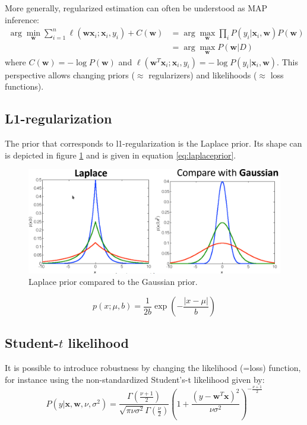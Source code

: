 \documentclass[a4paper,10pt,twoside]{article}
\begin{document}
More generally, regularized estimation can often be understood as MAP inference:
\begin{align*}
    \arg\min_{\mathbf{w}}\sum_{i=1}^{n}\ell(\mathbf{w}\mathbf{x}_i;\mathbf{x}_i, y_i)+C(\mathbf{w})&=\arg\max_{\mathbf{w}}\prod_i P(y_i|\mathbf{x}_i,\mathbf{w})P(\mathbf{w})\\
    &=\arg\max_{\mathbf{w}}P(\mathbf{w}|D)
\end{align*}
where $C(\mathbf{w})=-\log P(\mathbf{w})$ and $\ell(\mathbf{w}^T\mathbf{x}_i;\mathbf{x}_i,y_i)=-\log P(y_i|\mathbf{x}_i,\mathbf{w})$. This perspective allows changing priors ($\approx$ regularizers) and likelihoods ($\approx$ loss functions).

\subsection{L1-regularization}
The prior that corresponds to l1-regularization is the Laplace prior. Its shape can is depicted in figure \ref{laplaceprior} and is given in equation \ref{eq:laplaceprior}.

\begin{figure}[]
    \centering
    \includegraphics[width=.5\textwidth]{figures/laplaceprior.png}
    \caption{Laplace prior compared to the Gaussian prior.}
    \label{laplaceprior}
\end{figure}

\begin{equation}\label{eq:laplaceprior}
    p(x;\mu, b) = \frac{1}{2b}\exp(-\frac{|x-\mu|}{b})
\end{equation}

\subsection{Student-$t$ likelihood}
It is possible to introduce robustness by changing the likelihood (=loss) function, for instance using the non-standardized Student's-t likelihood given by:
\begin{equation*}
    P(y|\mathbf{x}, \mathbf{w},\nu,\sigma^2)=\frac{\Gamma (\frac{\nu+1}{2})}{\sqrt{\pi\nu\sigma^2}\Gamma(\frac{\nu}{2})}(1+\frac{(y-\mathbf{w}^T\mathbf{x})^2}{\nu\sigma^2})^{-\frac{\nu+1}{2}}
\end{equation*}
\end{document}
